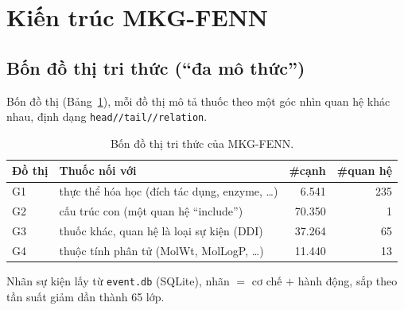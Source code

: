 \documentclass[conference]{IEEEtran}
\renewcommand{\colorbox}[2]{#2}
\begin{document}
\section{Kiến trúc MKG-FENN}
\label{sec:fenn-arch}

\subsection{Bốn đồ thị tri thức (``đa mô thức'')}
Bốn đồ thị (Bảng~\ref{tab:kg4}), mỗi đồ thị mô tả thuốc theo một góc nhìn quan hệ
khác nhau, định dạng \texttt{head//tail//relation}.

\begin{table}[t]
\caption{\colorbox{yellow}{Bốn đồ thị tri thức của MKG-FENN.}}
\label{tab:kg4}
\centering
\footnotesize
\renewcommand{\arraystretch}{1.15}
\begin{tabular}{l >{\raggedright\arraybackslash}p{3.3cm} rr}
\toprule
Đồ thị & Thuốc nối với & \#cạnh & \#quan hệ \\
\midrule
G1 & thực thể hóa học (đích tác dụng, enzyme, \dots) & 6.541  & 235 \\
G2 & cấu trúc con (một quan hệ ``include'') & 70.350 & 1 \\
G3 & thuốc khác, quan hệ là loại sự kiện (DDI) & 37.264 & 65 \\
G4 & thuộc tính phân tử (MolWt, MolLogP, \dots) & 11.440 & 13 \\
\bottomrule
\end{tabular}
\end{table}

Nhãn sự kiện lấy từ \texttt{event.db} (SQLite), nhãn $=$ cơ chế $+$ hành động, sắp
theo tần suất giảm dần thành 65 lớp.
\end{document}
